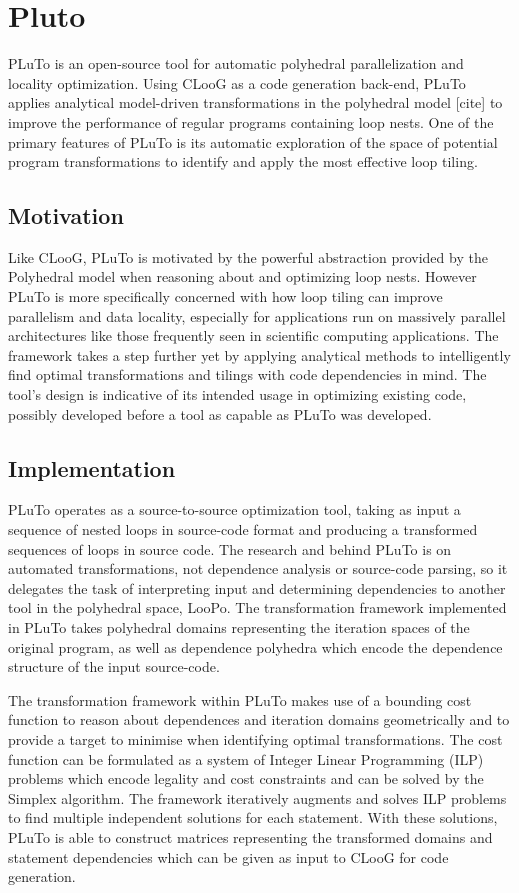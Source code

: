 \documentclass[a4paper,12pt,twoside]{report}
\begin{document}
\section{Pluto}
PLuTo is an open-source tool for automatic polyhedral parallelization and locality optimization. Using CLooG as a code generation
back-end, PLuTo applies analytical model-driven transformations in the polyhedral model [cite] to improve the performance
of regular programs containing loop nests. One of the primary features of PLuTo is its automatic exploration of the space
of potential program transformations to identify and apply the most effective loop tiling.

\subsection{Motivation}
Like CLooG, PLuTo is motivated by the powerful abstraction provided by the Polyhedral model when reasoning about and optimizing loop
nests. However PLuTo is more specifically concerned with how loop tiling can improve parallelism and data locality, especially
for applications run on massively parallel architectures like those frequently seen in scientific computing applications. The framework
takes a step further yet by applying analytical methods to intelligently find optimal transformations and tilings with code dependencies in mind.
The tool's design is indicative of its intended usage in optimizing existing code, possibly developed before a tool as capable as PLuTo was developed.

\subsection{Implementation}
PLuTo operates as a source-to-source optimization tool, taking as input a sequence of nested loops in source-code format
and producing a transformed sequences of loops in source code. The research and behind PLuTo is on automated transformations,
not dependence analysis or source-code parsing, so it delegates the task of interpreting input and determining dependencies
to another tool in the polyhedral space, LooPo. The transformation framework implemented in PLuTo takes polyhedral domains representing the iteration
spaces of the original program, as well as dependence polyhedra which encode the dependence structure of the input source-code.

The transformation framework within PLuTo makes use of a bounding cost function to reason about dependences and iteration domains
geometrically and to provide a target to minimise when identifying optimal transformations. The cost function can be formulated
as a system of Integer Linear Programming (ILP) problems which encode legality and cost constraints and can be solved by the Simplex
algorithm. The framework iteratively augments and solves ILP problems to find multiple independent solutions for each statement. With
these solutions, PLuTo is able to construct matrices representing the transformed domains and statement dependencies which can be
given as input to CLooG for code generation.
\end{document}
